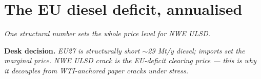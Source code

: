 \documentclass[10pt,a4paper]{article}
\begin{document}
\vspace{0.3cm}

\newpage

\section{The EU diesel deficit, annualised}\label{sec:9}

\textit{One structural number sets the whole price level for \mbox{NWE} ULSD.}

\noindent\textcolor{obred}{\textbf{Desk decision.}} \emph{EU27 is structurally short $\sim$29 Mt/y diesel; imports set the marginal price. NWE ULSD crack \emph{is} the EU-deficit clearing price --- this is why it decouples from WTI-anchored paper cracks under stress.}

\vspace{0.2cm}
\end{document}

